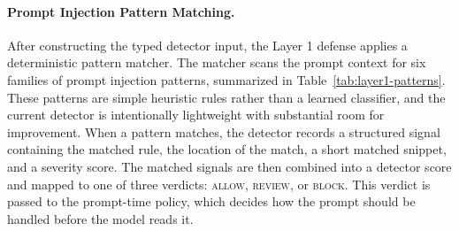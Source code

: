 \documentclass{article}
\begin{document}
\paragraph{Prompt Injection Pattern Matching.}
After constructing the typed detector input, the Layer 1 defense applies a
deterministic pattern matcher. The matcher scans the prompt context for six
families of prompt injection patterns, summarized in
Table~\ref{tab:layer1-patterns}. These patterns are simple heuristic rules rather
than a learned classifier, and the current detector is intentionally lightweight
with substantial room for improvement. When a pattern matches, the detector
records a structured signal containing the matched rule, the location of the
match, a short matched snippet, and a severity score. The matched signals are
then combined into a detector score and mapped to one of three verdicts:
\textsc{allow}, \textsc{review}, or \textsc{block}. This verdict is passed to
the prompt-time policy, which decides how the prompt should be handled before
the model reads it.
\end{document}
